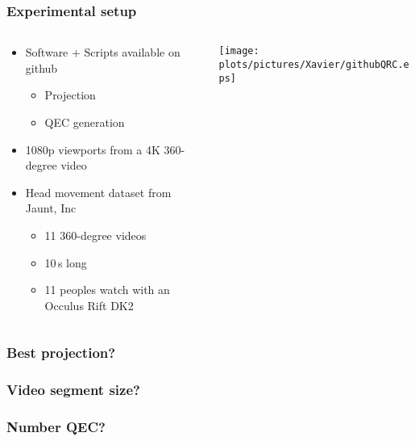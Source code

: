 \begin{frame}[c]
   \frametitle{Experimental setup}

   \begin{columns}[T]
     \begin{column}{0.65\linewidth}
        \begin{itemize}
            \item Software + Scripts available on github
            \begin{itemize}
               \item Projection
               \item QEC generation
            \end{itemize}
            \item 1080p viewports from a 4K 360-degree video
            \item Head movement dataset from Jaunt, Inc
            \begin{itemize}
               \item 11 360-degree videos
               \item 10\,s long
               \item 11 peoples watch with an Occulus Rift DK2
            \end{itemize}
         \end{itemize}
      \end{column}
      \begin{column}{0.35\linewidth}
         \texttt{[image: plots/pictures/Xavier/githubQRC.eps]}
      \end{column}
   \end{columns}

\end{frame}

\begin{frame}[c]
   \frametitle{Best projection?}

   \begin{independentCounter}
   \end{independentCounter}
\end{frame}

\begin{frame}[c]
   \frametitle{Video segment size?}

   \begin{independentCounter}
   \end{independentCounter}
\end{frame}

\begin{frame}[c]
   \frametitle{Number QEC?}

   \begin{independentCounter}
   \end{independentCounter}
\end{frame}
